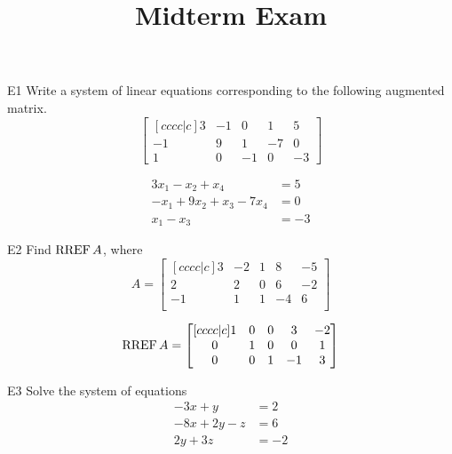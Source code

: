\documentclass{sbgLAexam}
\title{Midterm Exam}
\begin{document}
\begin{problem}{E1}
Write a system of linear equations corresponding to the following
augmented matrix.
\[
\begin{bmatrix}[cccc|c]
3 & -1 & 0 & 1 & 5 \\
-1 & 9 & 1 & -7 & 0 \\
1 & 0 & -1 & 0 & -3
\end{bmatrix}
\]
\end{problem}
\begin{solution}
\begin{align*}
3x_1-x_2+x_4 &= 5 \\
-x_1+9x_2+x_3-7x_4 &= 0 \\
x_1-x_3 &= -3
\end{align*}
\end{solution}

\begin{problem}{E2}
Find \(\operatorname{RREF} A\), where
\[
  A =
  \begin{bmatrix}[cccc|c]
    3 & -2 & 1 & 8 & -5 \\
    2 & 2 & 0 & 6 & -2 \\
    -1 & 1 & 1 & -4 & 6 \\
  \end{bmatrix}
\]
\end{problem}
\begin{solution}
\[
  \operatorname{RREF} A =
  \begin{bmatrix}[cccc|c]
    1 & 0 & 0 & 3 & -2 \\
    0 & 1 & 0 & 0 & 1 \\
    0 & 0 & 1 & -1 & 3
  \end{bmatrix}
\]
\end{solution}

\begin{extract}\newpage\end{extract}
\begin{problem}{E3}
Solve the system of equations
\begin{align*}
-3x +y &= 2\\
-8x+2y-z &= 6 \\
2y+3z &= -2
\end{align*}


\end{problem}
\end{document}
